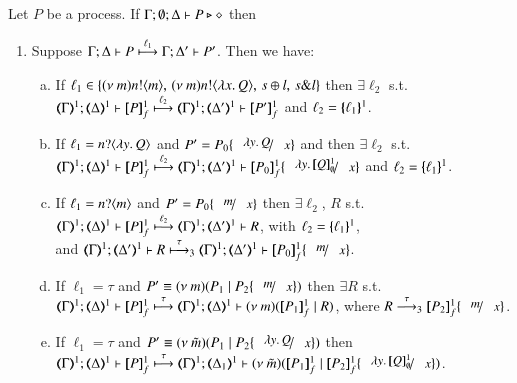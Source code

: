 \begin{proposition}\rm
	\label{prop:op_corr_HOp_to_HO}
	Let $P$ be a \HOp process.
	If $\Gamma; \emptyset; \Delta \proves P \hastype \Proc$ then
	\begin{enumerate}[1.]
		\item
			Suppose $\stytra{\Gamma}{\ell_1}{\Delta}{P}{\Delta'}{P'}$. Then we have:
			\begin{enumerate}[a)]
		    \item 
			If $\ell_1 \in \{\news{m}\bactout{n}{m}, \,\news{m}\bactout{n}{\abs{x}Q}, \,\bactsel{s}{l}, \,\bactbra{s}{l}   \}$
			then $\exists \ell_2$ s.t. \\
			$\stytra{\mapt{\Gamma}^{1}}{\ell_2}{\mapt{\Delta}^{1}}{\pmapp{P}{1}{f}}{\mapt{\Delta'}^{1}}{\pmapp{P'}{1}{f}}$
			and $\ell_2 = \mapa{\ell_1}^{1}$.
			
			\item If $\ell_1 = \bactinp{n}{\abs{y}Q}$ and
			$P' = P_0\subst{\abs{y}Q}{x}$ and			
			then $\exists \ell_2$ s.t. \\
			$\stytra{\mapt{\Gamma}^{1}}{\ell_2}{\mapt{\Delta}^{1}}{\pmapp{P}{1}{f}}{\mapt{\Delta'}^{1}}{\pmapp{P_0}{1}{f}\subst{\abs{y}\pmapp{Q}{1}{\emptyset}}{x}}$
			and $\ell_2 = \mapa{\ell_1}^{1}$.
			
			\item If $\ell_1 = \bactinp{n}{m}$
			and 
			$P' = P_0\subst{m}{x}$
			then $\exists \ell_2$, $R$ s.t. \\
			$\stytra{\mapt{\Gamma}^{1}}{\ell_2}{\mapt{\Delta}^{1}}{\pmapp{P}{1}{f}}{\mapt{\Delta'}^{1}}{R}$,
			with $\ell_2 = \mapa{\ell_1}^{1}$, \\
			and
			$\mapt{\Gamma}^{1}; \mapt{\Delta'}^{1} \proves R \hby{\tau}_3
				\mapt{\Gamma}^{1}; \mapt{\Delta'}^{1} \proves \pmapp{P_0}{1}{f}\subst{m}{x}$.
						
			\item If $\ell_1 = \tau$
			and $P' \scong \news{m}(P_1 \Par P_2\subst{m}{x})$
			then $\exists R$ s.t. \\
			$\stytra{\mapt{\Gamma}^{1}}{\tau}{\mapt{\Delta}^{1}}{\pmapp{P}{1}{f}}{\mapt{\Delta}^{1}}{
			\news{m}(\pmapp{P_1}{1}{f}
			\Par R)
			}$, where $R \by{\tau}_3  \pmapp{P_2}{1}{f}\subst{m}{x}$.

			
			
			
			\item If $\ell_1 = \tau$
			and $P' \scong \news{\tilde{m}}(P_1 \Par P_2\subst{\abs{y}Q}{x})$
			then \\
			$\stytra{\mapt{\Gamma}^{1}}{\tau}{\mapt{\Delta}^{1}}{\pmapp{P}{1}{f}}{\mapt{\Delta_1}^{1}}{
			\news{\tilde{m}}(\pmapp{P_1}{1}{f}
			\Par \pmapp{P_2}{1}{f}\subst{\abs{y}\pmapp{Q}{1}{\emptyset}}{x})
			}$.
			

\end{enumerate}
\end{enumerate}
\end{proposition}
